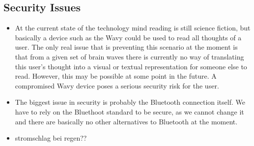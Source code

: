 \subsection{Security Issues}
\begin{itemize}
\item{
At the current state of the technology mind reading is still science fiction, but basically a device such as the Wavy could be used to read all thoughts of a user. The only real issue that is preventing this scenario at the moment is that from a given set of brain waves there is currently no way of translating this user’s thought into a visual or textual representation for someone else to read. However, this may be possible at some point in the future. A compromised Wavy device poses a serious security risk for the user.
}
\item{
The biggest issue in security is probably the Bluetooth connection itself. We have to rely on the Bluethoot standard to be secure, as we cannot change it and there are basically no other alternatives to Bluetooth at the moment.
}
\item{
stromschlag bei regen??
}
\end{itemize}
